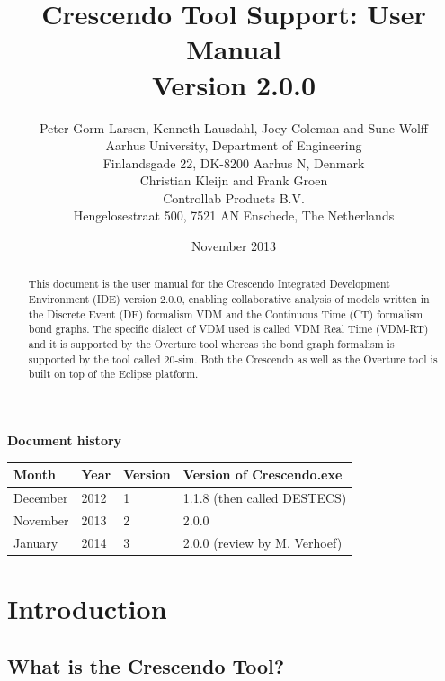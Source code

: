 \documentclass{crescendorepchap}
\begin{document}
\title{Crescendo Tool Support: User Manual \\{\large Version 2.0.0}}
\author{Peter Gorm Larsen, Kenneth Lausdahl, Joey Coleman and Sune Wolff \\
Aarhus University, Department of Engineering\\
Finlandsgade 22, DK-8200 Aarhus N, Denmark\\[5mm]
Christian Kleijn and Frank Groen\\
Controllab Products B.V.\\
Hengelosestraat 500, 7521 AN Enschede, The Netherlands
}

\date{November 2013}


\maketitle


\textbf{Document history}

\begin{tabular}{|l|l|l|l|}\hline
Month   & Year & Version & Version of Crescendo.exe \\ \hline
December& 2012 & 1       & 1.1.8 (then called DESTECS)  \\ \hline
November& 2013 & 2       & 2.0.0 \\ \hline
January& 2014 & 3 & 2.0.0 (review by M. Verhoef) \\ \hline
\end{tabular}

\tableofcontents

\begin{abstract}
This document is the user manual for the Crescendo Integrated
Development Environment (IDE) version 2.0.0, enabling collaborative
analysis of models written in the Discrete Event (DE) formalism VDM
and the Continuous Time (CT) formalism bond graphs. The specific
dialect of VDM used is called VDM Real Time (VDM-RT) and it is supported by
the Overture tool whereas the bond graph formalism is supported by the
tool called 20-sim.  Both the Crescendo as well as the Overture tool
is built on top of the Eclipse platform.
\end{abstract}

\chapter{Introduction}

\section{What is the Crescendo Tool?}\label{sec:crescendointro}
\end{document}
